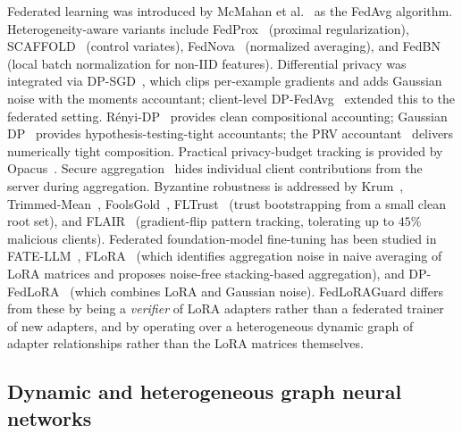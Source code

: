 \documentclass[12pt,a4paper]{article}
\theoremstyle{definition}
\theoremstyle{remark}
\newcommand{\modelname}{FedLoRAGuard}
\begin{document}
Federated learning was introduced by McMahan et al.~\cite{mcmahan2017fedavg} as the FedAvg algorithm. Heterogeneity-aware variants include FedProx~\cite{li2020fedprox} (proximal regularization), SCAFFOLD~\cite{karimireddy2020scaffold} (control variates), FedNova~\cite{wang2020fednova} (normalized averaging), and FedBN~\cite{li2021fedbn} (local batch normalization for non-IID features). Differential privacy was integrated via DP-SGD~\cite{abadi2016deep}, which clips per-example gradients and adds Gaussian noise with the moments accountant; client-level DP-FedAvg~\cite{geyer2017client,mcmahan2018learning} extended this to the federated setting. R\'enyi-DP~\cite{mironov2017renyi} provides clean compositional accounting; Gaussian DP~\cite{dong2022gaussian} provides hypothesis-testing-tight accountants; the PRV accountant~\cite{gopi2021numerical} delivers numerically tight composition. Practical privacy-budget tracking is provided by Opacus~\cite{yousefpour2021opacus}. Secure aggregation~\cite{bonawitz2017practical} hides individual client contributions from the server during aggregation. Byzantine robustness is addressed by Krum~\cite{blanchard2017machine}, Trimmed-Mean~\cite{yin2018byzantine}, FoolsGold~\cite{fung2020mitigating}, FLTrust~\cite{cao2021fltrust} (trust bootstrapping from a small clean root set), and FLAIR~\cite{sharma2023flair} (gradient-flip pattern tracking, tolerating up to $45\%$ malicious clients). Federated foundation-model fine-tuning has been studied in FATE-LLM~\cite{fan2023fatellm}, FLoRA~\cite{wang2024flora} (which identifies aggregation noise in naive averaging of LoRA matrices and proposes noise-free stacking-based aggregation), and DP-FedLoRA~\cite{dpfedlora2025} (which combines LoRA and Gaussian noise). \modelname{} differs from these by being a \emph{verifier} of LoRA adapters rather than a federated trainer of new adapters, and by operating over a heterogeneous dynamic graph of adapter relationships rather than the LoRA matrices themselves.

\subsection{Dynamic and heterogeneous graph neural networks}
\end{document}
